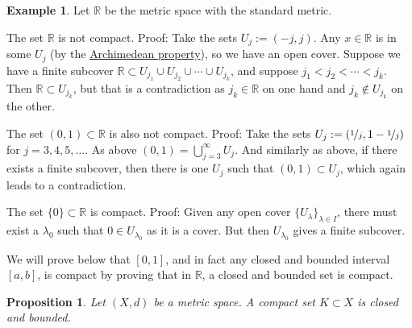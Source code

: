 \documentclass[12pt]{book}
\newcommand{\R}{{\mathbb{R}}}
\theoremstyle{plain}
\newtheorem{prop}[thm]{Proposition}
\theoremstyle{remark}
\theoremstyle{definition}
\theoremstyle{exercise}
\theoremstyle{example}
\newtheorem{example}[thm]{Example}
\begin{document}
\begin{example}
Let $\R$ be the metric space with the standard metric.

The set $\R$ is not compact.  Proof: Take the sets $U_j := (-j,j)$.
Any $x \in \R$ is in some $U_j$ (by the
\hyperref[thm:arch:i]{Archimedean property}), so we have an open cover.
Suppose we have a finite
subcover $\R \subset U_{j_1} \cup U_{j_2} \cup \cdots \cup U_{j_k}$,
and suppose $j_1 < j_2 < \cdots < j_k$.  Then $\R \subset U_{j_k}$, but that is
a contradiction as $j_k \in \R$ on one hand and $j_k \notin U_{j_k}$ on the
other.

The set $(0,1) \subset \R$ is also not compact.  Proof:  Take the 
sets $U_{j} := (\nicefrac{1}{j},1-\nicefrac{1}{j})$ for $j=3,4,5,\ldots$.
As above $(0,1) = \bigcup_{j=3}^\infty U_j$.  And similarly as above,
if there exists a finite subcover, then there is one $U_j$ such that $(0,1)
\subset U_j$, which again leads to a contradiction.

The set $\{ 0 \} \subset \R$ is compact.  Proof: Given any open cover $\{
U_{\lambda} \}_{\lambda \in I}$, there must exist a $\lambda_0$ such that $0
\in U_{\lambda_0}$ as it is a cover.  But then $U_{\lambda_0}$ gives a
finite subcover.

We will prove below that $[0,1]$, and in fact any closed and bounded
interval $[a,b]$, is compact by proving
that in $\R$, a closed and bounded set is compact.
\end{example}

\begin{prop}
Let $(X,d)$ be a metric space.  A compact set $K \subset X$ is closed and
bounded.
\end{prop}
\end{document}
